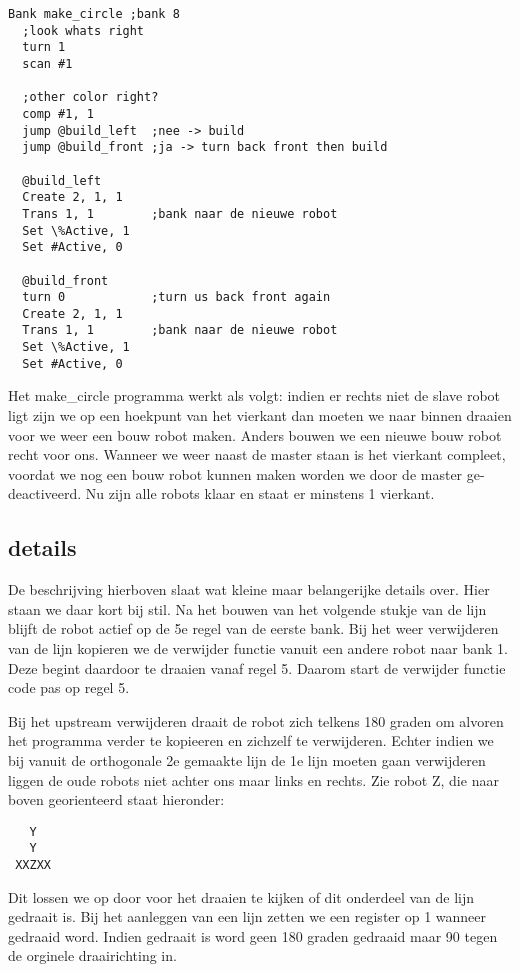 \documentclass[10pt]{article}
\begin{document}
\begin{verbatim}
Bank make_circle ;bank 8
  ;look whats right
  turn 1
  scan #1
  
  ;other color right?
  comp #1, 1 
  jump @build_left  ;nee -> build 
  jump @build_front ;ja -> turn back front then build 

  @build_left
  Create 2, 1, 1
  Trans 1, 1        ;bank naar de nieuwe robot
  Set \%Active, 1
  Set #Active, 0
  
  @build_front
  turn 0            ;turn us back front again
  Create 2, 1, 1
  Trans 1, 1        ;bank naar de nieuwe robot
  Set \%Active, 1
  Set #Active, 0
\end{verbatim}

Het make\_circle programma werkt als volgt: indien er rechts niet de slave robot ligt zijn we op een hoekpunt van het vierkant dan moeten we naar binnen draaien voor we weer een bouw robot maken. Anders bouwen we een nieuwe bouw robot recht voor ons. Wanneer we weer naast de master staan is het vierkant compleet, voordat we nog een bouw robot kunnen maken worden we door de master ge-deactiveerd. Nu zijn alle robots klaar en staat er minstens 1 vierkant.

\subsection{details}
De beschrijving hierboven slaat wat kleine maar belangerijke details over. Hier staan we daar kort bij stil. Na het bouwen van het volgende stukje van de lijn blijft de robot actief op de 5e regel van de eerste bank. Bij het weer verwijderen van de lijn kopieren we de verwijder functie vanuit een andere robot naar bank 1. Deze begint daardoor te draaien vanaf regel 5. Daarom start de verwijder functie code pas op regel 5.

Bij het upstream verwijderen draait de robot zich telkens 180 graden om alvoren het programma verder te kopieeren en zichzelf te verwijderen. Echter indien we bij vanuit de orthogonale 2e gemaakte lijn de 1e lijn moeten gaan verwijderen liggen de oude robots niet achter ons maar links en rechts. Zie robot Z, die naar boven georienteerd staat hieronder:

\begin{verbatim}
   Y
   Y
 XXZXX
\end{verbatim}

Dit lossen we op door voor het draaien te kijken of dit onderdeel van de lijn gedraait is. Bij het aanleggen van een lijn zetten we een register op 1 wanneer gedraaid word. Indien gedraait is word geen 180 graden gedraaid maar 90 tegen de orginele draairichting in.
\end{document}
